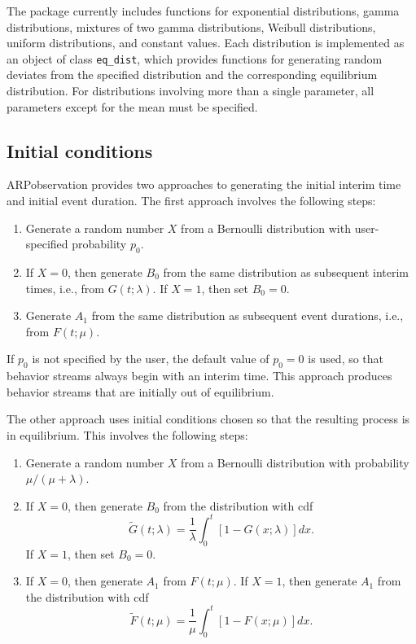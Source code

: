 \documentclass{article}\usepackage[]{graphicx}\usepackage[]{color}
\newcommand{\pkg}[1]{{\fontseries{b}\selectfont #1}}
\begin{document}
The package currently includes functions for exponential distributions, gamma distributions, mixtures of two gamma distributions, Weibull distributions, uniform distributions, and constant values. Each distribution is implemented as an object of class \texttt{eq\_dist}, which provides functions for generating random deviates from the specified distribution and the corresponding equilibrium distribution. For distributions involving more than a single parameter, all parameters except for the mean must be specified. 

\subsection{Initial conditions}

\pkg{ARPobservation} provides two approaches to generating the initial interim time and initial event duration. The first approach involves the following steps:
\begin{enumerate}
\item Generate a random number $X$ from a Bernoulli distribution with user-specified probability $p_0$. 
\item If $X = 0$, then generate $B_0$ from the same distribution as subsequent interim times, i.e., from $G(t; \lambda)$. If $X = 1$, then set $B_0 = 0$.
\item Generate $A_1$ from the same distribution as subsequent event durations, i.e., from $F(t; \mu)$.
\end{enumerate}
If $p_0$ is not specified by the user, the default value of $p_0 = 0$ is used, so that behavior streams always begin with an interim time. This approach produces behavior streams that are initially out of equilibrium. 

The other approach uses initial conditions chosen so that the resulting process is in equilibrium. This involves the following steps: 
\begin{enumerate}
\item Generate a random number $X$ from a Bernoulli distribution with probability $\mu / (\mu + \lambda)$. 
\item If $X = 0$, then generate $B_0$ from the distribution with cdf \[
\tilde{G}(t; \lambda) = \frac{1}{\lambda} \int_0^t \left[1 - G(x; \lambda)\right] dx. \]
If $X = 1$, then set $B_0 = 0$. 
\item If $X = 0$, then generate $A_1$ from $F(t; \mu)$. If $X = 1$, then generate $A_1$ from the distribution with cdf \[
\tilde{F}(t; \mu) = \frac{1}{\mu} \int_0^t \left[1 - F(x; \mu) \right] dx. \]
\end{enumerate}
\end{document}
